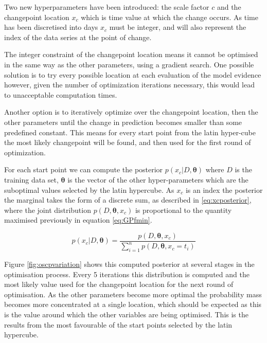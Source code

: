 \documentclass[a4paper,11pt]{report}
\begin{document}
Two new hyperparameters have been introduced: the scale factor \(c\) and the changepoint location \(x_c\) which is time value at which the change occurs. As time has been discretised into days \(x_c\) must be integer, and will also represent the index of the data series at the point of change. \par
The integer constraint of the changepoint location means it cannot be optimised in the same way as the other parameters, using a gradient search. One possible solution is to try every possible location at each evaluation of the model evidence however, given the number of optimization iterations necessary, this would lead to unacceptable computation times.

Another option is to iteratively optimize over the changepoint location, then the other parameters until the change in prediction becomes smaller than some predefined constant. This means for every start point from the latin hyper-cube the most likely changepoint will be found, and then used for the first round of optimization. 

For each start point we can compute the posterior \(p(x_c | D, \boldsymbol{\theta})\) where \(D\) is the training data set, \(\boldsymbol{\theta}\) is the vector of the other hyper-parameters which are the suboptimal values selected by the latin hypercube. As \(x_c\) is an index the posterior the marginal takes the form of a discrete sum, as described in \ref{eq:xcposterior}, where the joint distribution \(p(D,\boldsymbol{\theta},x_c)\) is proportional to the quantity maximised previously in equation \ref{eq:GPfmin}.

\begin{equation} \label{eq:xcposterior}
p(x_c | D, \boldsymbol{\theta}) = \frac{p(D,\boldsymbol{\theta},x_c)} {\displaystyle \sum_{i=1}^{n} p(D,\boldsymbol{\theta},x_c = t_i)}
\end{equation}

Figure \ref{fig:oscpvariation} shows this computed posterior at several stages in the optimisation process. Every 5 iterations this distribution is computed and the most likely value used for the changepoint location for the next round of optimisation. As the other parameters become more optimal the probability mass becomes more concentrated at a single location, which should be expected as this is the value around which the other variables are being optimised. This is the results from the most favourable of the start points selected by the latin hypercube.
\end{document}
